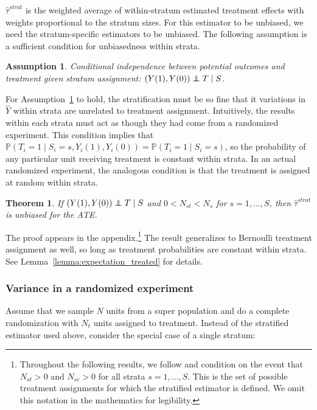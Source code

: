 \documentclass[12pt]{article}
\newtheorem{theorem}{Theorem}[section]
\newtheorem{assumption}{Assumption}
\newcommand{\pr}{\mathbb{P}} %
\newcommand\independent{\protect\mathpalette{\protect\independenT}{\perp}}
\def\independenT#1#2{\mathrel{\rlap{$#1#2$}\mkern2mu{#1#2}}}
\begin{document}
$\hat{\tau}^{strat}$ is the weighted average of within-stratum estimated treatment effects with weights proportional to the stratum sizes.
For this estimator to be unbiased, we need the stratum-specific estimators to be unbiased.
The following assumption is a sufficient condition for unbiasedness within strata.

\begin{assumption}\label{assume}
Conditional independence between potential outcomes and treatment given stratum assignment: $(Y(1), Y(0)) \independent T \mid S$.
\end{assumption}

For Assumption~\ref{assume} to hold, the stratification must be so fine that it variations in $\hat{Y}$ within strata are unrelated to treatment assignment.
Intuitively, the results within each strata must act as though they had come from a randomized experiment.
This condition implies that $\pr(T_i = 1 \mid S_i = s, Y_i(1), Y_i(0)) = \pr(T_i = 1 \mid S_i = s) $, so the probability of any particular unit receiving treatment is constant within strata.
In an actual randomized experiment, the analogous condition is that the treatment is assigned at random within strata.




\begin{theorem}\label{thm:tau_hat_adjusted_unbiased}
If $(Y(1), Y(0) )\independent T \mid S$ and $0 < N_{st} < N_s$ for $s = 1, \dots, S$, then $\hat{\tau}^{strat}$ is unbiased for the ATE.
\end{theorem}


The proof appears in the appendix.\footnote{
Throughout the following results, we follow \citet{miratrix_adjusting_2013} and condition on the event that $N_{st} >0 $ and $N_{sc} >0$ for all strata $s = 1, \dots, S$.
This is the set of possible treatment assignments for which the stratified estimator is defined.
We omit this notation in the mathematics for legibility.
}
The result generalizes to Bernoulli treatment assignment as well, so long as treatment probabilities are constant within strata.
See Lemma~\ref{lemma:expectation_treated} for details.



\subsubsection{Variance in a randomized experiment}
Assume that we sample $N$ units from a super population and do a complete randomization with $N_t$ units assigned to treatment.  
Instead of the stratified estimator used above, consider the special case of a single stratum:
\end{document}
